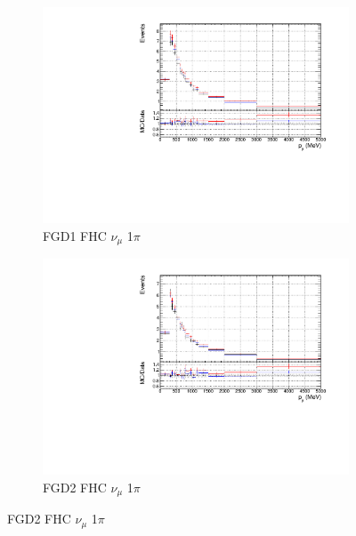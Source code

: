 \begin{figure}[!h]
\begin{subfigure}{0.49\textwidth}
  \centering
  \includegraphics[width=\textwidth]{figs/priorpred1D_p_FGD1_numuCC_1pi}
  \caption{FGD1 FHC $\nu_{\mu}$ 1$\pi$}
\end{subfigure}
\begin{subfigure}{0.49\textwidth}
  \centering
  \includegraphics[width=\textwidth]{figs/priorpred1D_p_FGD2_numuCC_1pi}
  \caption{FGD2 FHC $\nu_{\mu}$ 1$\pi$}
\end{subfigure}


\end{figure}
